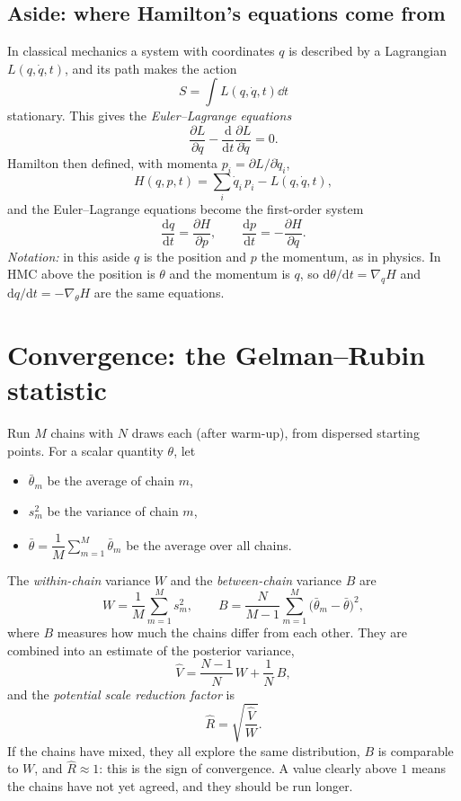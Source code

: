 \subsection{Aside: where Hamilton's equations come from}
In classical mechanics a system with coordinates $q$ is described by a Lagrangian $L(q, \dot q, t)$, and its path makes the action
\[
S = \int L(q, \dot q, t)\dd t
\]
stationary. This gives the \emph{Euler--Lagrange equations}
\[
\frac{\partial L}{\partial q} - \frac{\mathrm{d}}{\mathrm{d}t}\frac{\partial L}{\partial \dot q} = 0.
\]
Hamilton then defined, with momenta $p_i = \partial L/\partial \dot q_i$,
\[
H(q, p, t) = \sum_i \dot q_i\,p_i - L(q, \dot q, t),
\]
and the Euler--Lagrange equations become the first-order system
\[
\frac{\mathrm{d}q}{\mathrm{d}t} = \frac{\partial H}{\partial p}, \qquad \frac{\mathrm{d}p}{\mathrm{d}t} = -\frac{\partial H}{\partial q}.
\]
\emph{Notation:} in this aside $q$ is the position and $p$ the momentum, as in physics. In HMC above the position is $\theta$ and the momentum is $q$, so $\mathrm{d}\theta/\mathrm{d}t = \nabla_q H$ and $\mathrm{d}q/\mathrm{d}t = -\nabla_\theta H$ are the same equations.

\section{Convergence: the Gelman--Rubin statistic}
Run $M$ chains with $N$ draws each (after warm-up), from dispersed starting points. For a scalar quantity $\theta$, let
\begin{itemize}[nosep]
\item $\bar\theta_m$ be the average of chain $m$,
\item $s_m^2$ be the variance of chain $m$,
\item $\bar\theta = \dfrac1M\displaystyle\sum_{m=1}^{M}\bar\theta_m$ be the average over all chains.
\end{itemize}
The \emph{within-chain} variance $W$ and the \emph{between-chain} variance $B$ are
\[
W = \frac1M\sum_{m=1}^{M}s_m^2, \qquad
B = \frac{N}{M-1}\sum_{m=1}^{M}\big(\bar\theta_m - \bar\theta\big)^2,
\]
where $B$ measures how much the chains differ from each other. They are combined into an estimate of the posterior variance,
\[
\hat V = \frac{N-1}{N}\,W + \frac1N\,B,
\]
and the \emph{potential scale reduction factor} is
\[
\hat R = \sqrt{\frac{\hat V}{W}}.
\]
If the chains have mixed, they all explore the same distribution, $B$ is comparable to $W$, and $\hat R \approx 1$: this is the sign of convergence. A value clearly above $1$ means the chains have not yet agreed, and they should be run longer.

